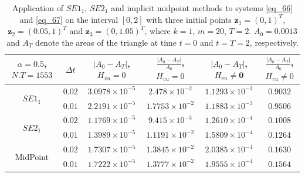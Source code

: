 \documentclass[a4paper, 10pt]{article}
\newcommand{\SEoo}{SE1_1}
\newcommand{\SEto}{SE2_1}
\begin{document}
\begin{table}[ht!]
\centering
\begin{tabular}{|c|c|c|c||c|c|}
\hline
 $\alpha =0.5$, $N.T = 1553$ & $\Delta{t}$ & $|A_0 - A_{T}|$, $H_{vu}=0$ & $\frac{|A_0 - A_{T}|}{A_0}$, $H_{vu} = 0 $ & $|A_0-A_T|$, $H_{vu} \ne \bm{0}$ & $\frac{|A_0 - A_{T}|}{A_0}$, $H_{vu} \neq 0 $ \\ \hline
\multirow{2}{*}{$\SEoo$} & $0.02$ & $3.0978\times 10^{-5}$ & $2.478\times 10^{-2}$ & $1.1293\times 10^{-3}$ & $0.9032$ \\
                         & $0.01$ & $2.2191\times 10^{-5}$ & $1.7753\times 10^{-2}$ & $1.1883\times 10^{-3}$ & $0.9506$ \\ \hline
\multirow{2}{*}{$\SEto$} & $0.02$ & $1.1769\times 10^{-5}$ & $9.415\times 10^{-3}$ & $1.2610\times 10^{-4}$ & $0.1008$ \\
                         & $0.01$ & $1.3989\times 10^{-5}$ & $1.1191\times 10^{-2}$ & $1.5809\times 10^{-4}$ & $0.1264$ \\ \hline
\multirow{2}{*}{MidPoint} & $0.02$ & $1.7307\times 10^{-5}$ & $1.3845\times 10^{-2}$ & $2.0385\times 10^{-4}$ & $0.1630$ \\
                          & $0.01$ & $1.7222\times 10^{-5}$ & $1.3777\times 10^{-2}$ & $1.9555\times 10^{-4}$ & $0.1564$ \\ \hline
\end{tabular}
\caption{Application of $\SEoo$, $\SEto$ and implicit midpoint methods to systems \eqref{eq_66} and \eqref{eq_67} on the interval $[0,2]$ with three initial points $\mathbf{z}_1 = (0,1)^{T}$, $\mathbf{z}_2 =(0.05,1)^{T}$ and $\mathbf{z}_3 = (0,1.05)^{T}$, where $k =1$, $m =20$, $T = 2$. $A_0 = 0.0013$ and $A_T$ denote the areas of the triangle at time $t = 0$ and $t = T = 2$, respectively.}
\label{tab:area-nonlinear}
\end{table}
\end{document}
